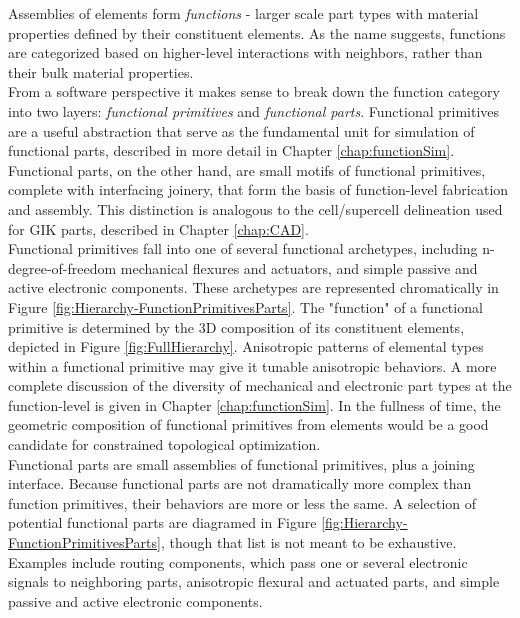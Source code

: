 {Assemblies of elements form \textit{functions} - larger scale part types with material properties defined by their constituent elements.  As the name suggests, functions are categorized based on higher-level interactions with neighbors, rather than their bulk material properties.\\

From a software perspective it makes sense to break down the function category into two layers: \textit{functional primitives} and \textit{functional parts}.  Functional primitives are a useful abstraction that serve as the fundamental unit for simulation of functional parts, described in more detail in Chapter \ref{chap:functionSim}.  Functional parts, on the other hand, are small motifs of functional primitives, complete with interfacing joinery, that form the basis of function-level fabrication and assembly.  This distinction is analogous to the cell/supercell delineation used for GIK parts, described in Chapter \ref{chap:CAD}.\\

Functional primitives fall into one of several functional archetypes, including n-degree-of-freedom mechanical flexures and actuators, and simple passive and active electronic components.  These archetypes are represented chromatically in Figure \ref{fig:Hierarchy-FunctionPrimitivesParts}.  The "function" of a functional primitive is determined by the 3D composition of its constituent elements, depicted in Figure \ref{fig:FullHierarchy}.  Anisotropic patterns of elemental types within a functional primitive may give it tunable anisotropic behaviors.  A more complete discussion of the diversity of mechanical and electronic part types at the function-level is given in Chapter \ref{chap:functionSim}.  In the fullness of time, the geometric composition of functional primitives from elements would be a good candidate for constrained topological optimization.\\

Functional parts are small assemblies of functional primitives, plus a joining interface.  Because functional parts are not dramatically more complex than function primitives, their behaviors are more or less the same.  A selection of potential functional parts are diagramed in Figure \ref{fig:Hierarchy-FunctionPrimitivesParts}, though that list is not meant to be exhaustive.  Examples include routing components, which pass one or several electronic signals to neighboring parts, anisotropic flexural and actuated parts, and simple passive and active electronic components.\\

}
